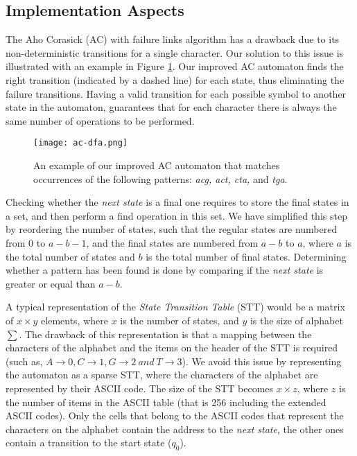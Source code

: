 \documentclass[conference]{IEEEtran}
\begin{document}
\subsection {Implementation Aspects}
\label{sec:impl}

The Aho Corasick (AC) with failure links algorithm has a drawback due to its non-deterministic transitions for a single character. Our solution to this issue is illustrated with an example in Figure \ref{fig:ac-dfa}. Our improved AC automaton finds the right transition (indicated by a dashed line) for each state, thus eliminating the failure transitions. Having a valid transition for each possible symbol to another state in the automaton, guarantees that for each character there is always the same number of operations to be performed.

\begin{figure}[!ht]
	\centering
	\texttt{[image: ac-dfa.png]}
	\caption{An example of our improved AC automaton that matches occurrences of the following patterns: \emph{acg, act, cta,} and \emph{tga}.}
	\label{fig:ac-dfa}
\end{figure}


Checking whether the \emph{next state} is a final one requires to store the final states in a set, and then perform a find operation in this set. We have simplified this step by reordering the number of states, such that the regular states are numbered from 0 to $a-b-1$, and the final states are numbered from $a-b$ to $a$, where $a$ is the total number of states and $b$ is the total number of final states. Determining whether a pattern has been found is done by comparing if the \emph{next state} is greater or equal than $a-b$.

A typical representation of the \emph{State Transition Table} (STT) would be a matrix of $x\times y$ elements, where $x$ is the number of states, and $y$ is the size of alphabet $\sum$. The drawback of this representation is that a mapping between the characters of the alphabet and the items on the header of the STT is required (such as, $A\rightarrow0, C\rightarrow1, G\rightarrow2~ and ~T\rightarrow3$). We avoid this issue by representing the automaton as a sparse STT, where the characters of the alphabet are represented by their ASCII code. The size of the STT becomes $x\times z$, where $z$ is the number of items in the ASCII table (that is 256 including the extended ASCII codes). Only the cells that belong to the ASCII codes that represent the characters on the alphabet contain the address to the \emph{next state}, the other ones contain a transition to the start state ($q_0$). 
\end{document}
